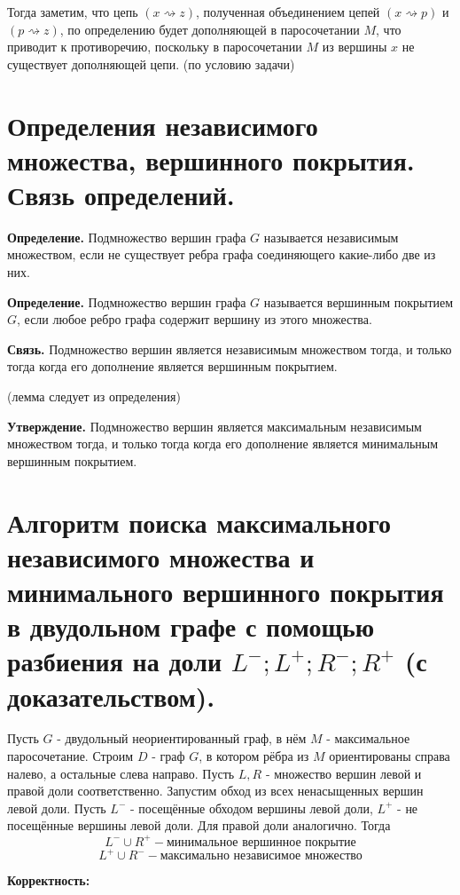         Тогда заметим, что цепь $(x \rightsquigarrow z)$, полученная объединением цепей $(x \rightsquigarrow p)$ и $(p \rightsquigarrow z)$, по определению будет дополняющей в паросочетании $M$, что приводит к противоречию, поскольку в паросочетании $M$ из вершины $x$ не существует дополняющей цепи. (по условию задачи)
        



\setcounter{section}{68}
\section{Определения независимого множества, вершинного покрытия. Связь определений.}

\textbf{Определение.} Подмножество вершин графа $G$ называется независимым множеством, если не существует ребра графа соединяющего какие-либо две из них.

\textbf{Определение.} Подмножество вершин графа $G$ называется вершинным покрытием $G$, если любое ребро графа содержит вершину из этого множества.

\textbf{Связь.} Подмножество вершин является независимым множеством тогда, и только тогда когда его дополнение является вершинным покрытием. 

(лемма следует из определения)

\textbf{Утверждение.} Подмножество вершин является максимальным независимым множеством тогда, и только тогда когда его дополнение является минимальным вершинным покрытием.

\setcounter{section}{69}
\section{Алгоритм поиска максимального независимого множества и минимального вершинного покрытия в двудольном графе с помощью разбиения на доли $L^-; L^+;R^-;R^+$ (с доказательством).}

Пусть $G$ - двудольный неориентированный граф, в нём $M$ - максимальное паросочетание. Строим $D$ - граф $G$, в котором рёбра из $M$ ориентированы справа налево, а остальные слева направо. Пусть $L, R$ - множество вершин левой и правой доли соответственно. Запустим обход из всех ненасыщенных вершин левой доли. Пусть $L^-$ - посещённые обходом вершины левой доли, $L^+$ - не посещённые вершины левой доли. Для правой доли аналогично. Тогда 
$$L^- \cup R^+ - \text{минимальное вершинное покрытие}$$
$$L^+ \cup R^- - \text{максимально независимое множество}$$

\textbf{Корректность:}

